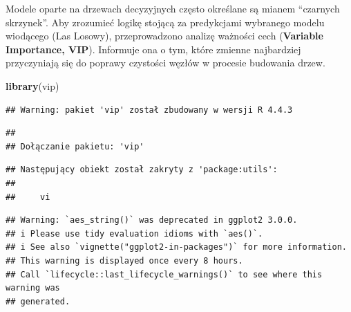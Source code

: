 \documentclass[
]{article}
\newenvironment{Shaded}{\begin{snugshade}}{\end{snugshade}}
\newcommand{\AttributeTok}[1]{\textcolor[rgb]{0.13,0.29,0.53}{#1}}
\newcommand{\DecValTok}[1]{\textcolor[rgb]{0.00,0.00,0.81}{#1}}
\newcommand{\FunctionTok}[1]{\textcolor[rgb]{0.13,0.29,0.53}{\textbf{#1}}}
\newcommand{\NormalTok}[1]{#1}
\newcommand{\SpecialCharTok}[1]{\textcolor[rgb]{0.81,0.36,0.00}{\textbf{#1}}}
\newcommand{\StringTok}[1]{\textcolor[rgb]{0.31,0.60,0.02}{#1}}
\begin{document}
Modele oparte na drzewach decyzyjnych często określane są mianem
``czarnych skrzynek''. Aby zrozumieć logikę stojącą za predykcjami
wybranego modelu wiodącego (Las Losowy), przeprowadzono analizę ważności
cech (\textbf{Variable Importance, VIP}). Informuje ona o tym, które
zmienne najbardziej przyczyniają się do poprawy czystości węzłów w
procesie budowania drzew.

\begin{Shaded}
\begin{Highlighting}[]
\FunctionTok{library}\NormalTok{(vip)}
\end{Highlighting}
\end{Shaded}

\begin{verbatim}
## Warning: pakiet 'vip' został zbudowany w wersji R 4.4.3
\end{verbatim}

\begin{verbatim}
## 
## Dołączanie pakietu: 'vip'
\end{verbatim}

\begin{verbatim}
## Następujący obiekt został zakryty z 'package:utils':
## 
##     vi
\end{verbatim}

\begin{Shaded}
\end{Shaded}

\begin{verbatim}
## Warning: `aes_string()` was deprecated in ggplot2 3.0.0.
## i Please use tidy evaluation idioms with `aes()`.
## i See also `vignette("ggplot2-in-packages")` for more information.
## This warning is displayed once every 8 hours.
## Call `lifecycle::last_lifecycle_warnings()` to see where this warning was
## generated.
\end{verbatim}
\end{document}
